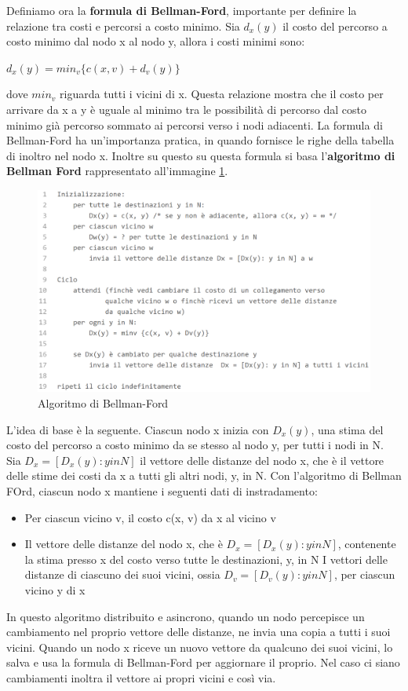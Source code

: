 \documentclass[11pt,a4paper]{book}
\begin{document}
Definiamo ora la \textbf{formula di Bellman-Ford}, importante per definire la relazione tra costi e percorsi a costo minimo. Sia $d_{x}(y)$ il costo del percorso a costo minimo dal nodo x al nodo y, allora i costi minimi sono:
\begin{center}
	$d_{x}(y) = min_{v}\{c(x, v) + d_{v}(y)\}$
\end{center}
dove $min_{v}$ riguarda tutti i vicini di x. Questa relazione mostra che il costo per arrivare da x a y è uguale al minimo tra le possibilità di percorso dal costo minimo già percorso sommato ai percorsi verso i nodi adiacenti.
La formula di Bellman-Ford ha un'importanza pratica, in quando fornisce le righe della tabella di inoltro nel nodo x. Inoltre su questo su questa formula si basa l'\textbf{algoritmo di Bellman Ford} rappresentato all'immagine \ref{fig: 067}.
\begin{figure}
	\includegraphics[scale=0.4]{img/067.png}
	\caption{Algoritmo di Bellman-Ford}
	\label{fig: 067}
\end{figure}
L'idea di base è la seguente. Ciascun nodo x inizia con $D_{x}(y)$, una stima del costo del percorso a costo minimo da se stesso al nodo y, per tutti i nodi in N. Sia $D_{x} = [D_{x}(y): y in N]$ il vettore delle distanze del nodo x, che è il vettore delle stime dei costi da x a tutti gli altri nodi, y, in N. Con l'algoritmo di Bellman FOrd, ciascun nodo x mantiene i seguenti dati di instradamento:
\begin{itemize}
	\item Per ciascun vicino v, il costo c(x, v) da x al vicino v
	\item Il vettore delle distanze del nodo x, che è $D_{x} = [D_{x}(y): y in N]$, contenente la stima presso x del costo verso tutte le destinazioni, y, in N
	I vettori delle distanze di ciascuno dei suoi vicini, ossia $D_{v} = [D_{v}(y): y in N]$, per ciascun vicino y di x
\end{itemize}
In questo algoritmo distribuito e asincrono, quando un nodo percepisce un cambiamento nel proprio vettore delle distanze, ne invia una copia a tutti i suoi vicini. Quando un nodo x riceve un nuovo vettore da qualcuno dei suoi vicini, lo salva e usa la formula di Bellman-Ford per aggiornare il proprio. Nel caso ci siano cambiamenti inoltra il vettore ai propri vicini e così via.
\end{document}
